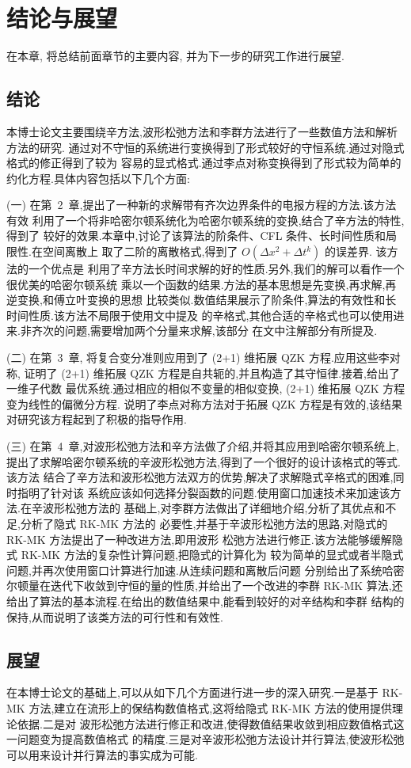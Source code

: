 \chapter{结论与展望}
在本章, 将总结前面章节的主要内容, 并为下一步的研究工作进行展望.
\section{结论}
本博士论文主要围绕辛方法,波形松弛方法和李群方法进行了一些数值方法和解析方法的研究.
通过对不守恒的系统进行变换得到了形式较好的守恒系统.通过对隐式格式的修正得到了较为
容易的显式格式.通过李点对称变换得到了形式较为简单的约化方程.具体内容包括以下几个方面:

(一) 在第~2~章,提出了一种新的求解带有齐次边界条件的电报方程的方法.该方法有效
利用了一个将非哈密尔顿系统化为哈密尔顿系统的变换,结合了辛方法的特性,得到了
较好的效果.本章中,讨论了该算法的阶条件、CFL 条件、长时间性质和局限性.在空间离散上
取了二阶的离散格式,得到了 $O(\Delta x^2+ \Delta t^k)$ 的误差界. 该方法的一个优点是
利用了辛方法长时间求解的好的性质.另外,我们的解可以看作一个很优美的哈密尔顿系统
乘以一个函数的结果.方法的基本思想是先变换,再求解,再逆变换,和傅立叶变换的思想
比较类似.数值结果展示了阶条件,算法的有效性和长时间性质.该方法不局限于使用文中提及
的辛格式,其他合适的辛格式也可以使用进来.非齐次的问题,需要增加两个分量来求解,该部分
在文中注解部分有所提及.

(二) 在第~3~章, 将复合变分准则应用到了 (2+1) 维拓展 QZK 方程.应用这些李对称,
证明了 (2+1) 维拓展 QZK 方程是自共轭的,并且构造了其守恒律.接着,给出了一维子代数
最优系统.通过相应的相似不变量的相似变换, (2+1) 维拓展 QZK 方程变为线性的偏微分方程.
说明了李点对称方法对于拓展 QZK 方程是有效的,该结果对研究该方程起到了积极的指导作用.

(三) 在第~4~章,对波形松弛方法和辛方法做了介绍,并将其应用到哈密尔顿系统上,
提出了求解哈密尔顿系统的辛波形松弛方法,得到了一个很好的设计该格式的等式.该方法
结合了辛方法和波形松弛方法双方的优势,解决了求解隐式辛格式的困难,同时指明了针对该
系统应该如何选择分裂函数的问题.使用窗口加速技术来加速该方法.在辛波形松弛方法的
基础上,对李群方法做出了详细地介绍,分析了其优点和不足,分析了隐式 RK-MK 方法的
必要性,并基于辛波形松弛方法的思路,对隐式的 RK-MK 方法提出了一种改进方法,即用波形
松弛方法进行修正.该方法能够缓解隐式 RK-MK 方法的复杂性计算问题,把隐式的计算化为
较为简单的显式或者半隐式问题,并再次使用窗口计算进行加速.从连续问题和离散后问题
分别给出了系统哈密尔顿量在迭代下收敛到守恒的量的性质,并给出了一个改进的李群 RK-MK
算法,还给出了算法的基本流程.在给出的数值结果中,能看到较好的对辛结构和李群
结构的保持,从而说明了该类方法的可行性和有效性.

\section{展望}
在本博士论文的基础上,可以从如下几个方面进行进一步的深入研究.一是基于 RK-MK
方法,建立在流形上的保结构数值格式,这将给隐式 RK-MK 方法的使用提供理论依据.二是对
波形松弛方法进行修正和改进,使得数值结果收敛到相应数值格式这一问题变为提高数值格式
的精度.三是对辛波形松弛方法设计并行算法,使波形松弛可以用来设计并行算法的事实成为可能.
